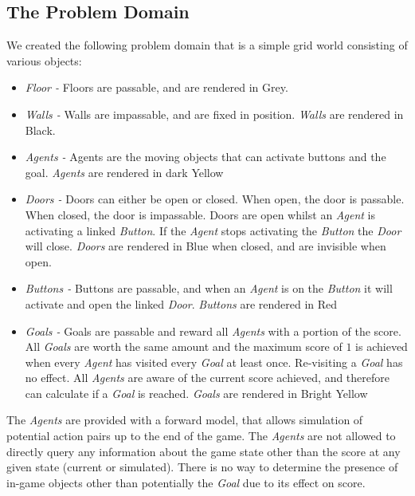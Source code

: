 \documentclass{IEEEtran}
\begin{document}
\subsection{The Problem Domain}
We created the following problem domain that is a simple grid world consisting of various objects:
\begin{itemize}
\item{\emph{Floor - } Floors are passable, and are rendered in Grey.}
\item{\emph{Walls -} Walls are impassable, and are fixed in position. \emph{Walls} are rendered in Black.}
\item{\emph{Agents -} Agents are the moving objects that can activate buttons and the goal. \emph{Agents} are rendered in dark Yellow}
\item{\emph{Doors -} Doors can either be open or closed. When open, the door is passable. When closed, the door is impassable. Doors are open whilst an \emph{Agent} is activating a linked \emph{Button}. If the \emph{Agent} stops activating the \emph{Button} the \emph{Door} will close. \emph{Doors} are rendered in Blue when closed, and are invisible when open.}
\item{\emph{Buttons -} Buttons are passable, and when an \emph{Agent} is on the \emph{Button} it will activate and open the linked \emph{Door}. \emph{Buttons} are rendered in Red}
\item{\emph{Goals -} Goals are passable and reward all \emph{Agents} with a portion of the score. All \emph{Goals} are worth the same amount and the maximum score of $1$ is achieved when every \emph{Agent} has visited every \emph{Goal} at least once. Re-visiting a \emph{Goal} has no effect. All \emph{Agents} are aware of the current score achieved, and therefore can calculate if a \emph{Goal} is reached. \emph{Goals} are rendered in Bright Yellow}
\end{itemize}

The \emph{Agents} are provided with a forward model, that allows simulation of potential action pairs up to the end of the game. The \emph{Agents} are not allowed to directly query any information about the game state other than the score at any given state (current or simulated). There is no way to determine the presence of in-game objects other than potentially the \emph{Goal} due to its effect on score.
\end{document}
